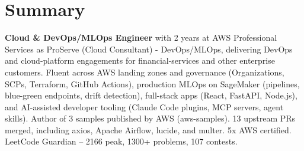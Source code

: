 \section{\textbf{Summary}}
\vspace{1pt}
\small{\textbf{Cloud \& DevOps/MLOps Engineer} with 2 years at AWS Professional Services as ProServe (Cloud Consultant) - DevOps/MLOps, delivering DevOps and cloud-platform engagements for financial-services and other enterprise customers. Fluent across AWS landing zones and governance (Organizations, SCPs, Terraform, GitHub Actions), production MLOps on SageMaker (pipelines, blue-green endpoints, drift detection), full-stack apps (React, FastAPI, Node.js), and AI-assisted developer tooling (Claude Code plugins, MCP servers, agent skills). Author of 3 samples published by AWS (aws-samples). 13 upstream PRs merged, including axios, Apache Airflow, lucide, and multer. 5x AWS certified. LeetCode Guardian -- 2166 peak, 1300+ problems, 107 contests.}
\vspace{-2mm}
